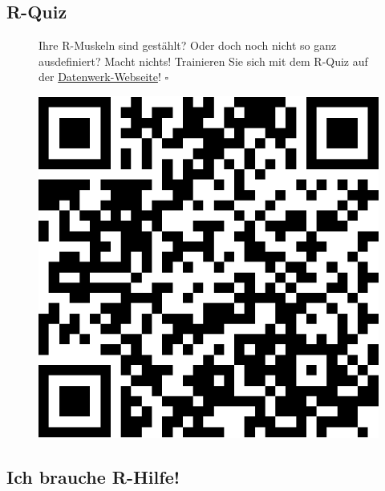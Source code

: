 \documentclass[
  letterpaper,
  oneside,
  open=any]{scrbook}
\theoremstyle{definition}
\theoremstyle{definition}
\theoremstyle{definition}
\theoremstyle{remark}
\begin{document}
\subsection{R-Quiz}\label{r-quiz}

\begin{figure}

\begin{minipage}{0.80\linewidth}
Ihre R-Muskeln sind gestählt? Oder doch noch nicht so ganz ausdefiniert?
Macht nichts! Trainieren Sie sich mit dem R-Quiz auf der
\href{https://sebastiansauer.github.io/Datenwerk/posts/r-quiz/r-quiz}{Datenwerk-Webseite}!
\(\square\)\end{minipage}%
%
\begin{minipage}{0.20\linewidth}

\begin{center}
\includegraphics[width=0.75\linewidth,height=\textheight,keepaspectratio]{020-R_files/figure-pdf/unnamed-chunk-24-1.pdf}
\end{center}

\end{minipage}%

\end{figure}%

\subsection{Ich brauche R-Hilfe!}\label{r-faq}
\end{document}
